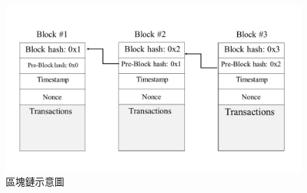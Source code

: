 \begin{figure}[!htbp]
\centering
\includegraphics[scale=0.5]{images/1.jpg}
\caption{區塊鏈示意圖}
\label{i:byz-latency}
\end{figure}
